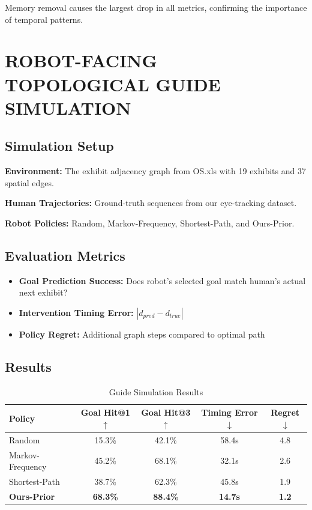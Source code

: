 \documentclass[letterpaper]{article}
\begin{document}
Memory removal causes the largest drop in all metrics, confirming the importance of temporal patterns.

\section{ROBOT-FACING TOPOLOGICAL GUIDE SIMULATION}

\subsection{Simulation Setup}

\textbf{Environment:} The exhibit adjacency graph from OS.xls with 19 exhibits and 37 spatial edges.

\textbf{Human Trajectories:} Ground-truth sequences from our eye-tracking dataset.

\textbf{Robot Policies:} Random, Markov-Frequency, Shortest-Path, and Ours-Prior.

\subsection{Evaluation Metrics}

\begin{itemize}
    \item \textbf{Goal Prediction Success:} Does robot's selected goal match human's actual next exhibit?
    \item \textbf{Intervention Timing Error:} $|d_{pred} - d_{true}|$
    \item \textbf{Policy Regret:} Additional graph steps compared to optimal path
\end{itemize}

\subsection{Results}

\begin{table}[h]
\centering
\caption{Guide Simulation Results}
\begin{tabular}{lcccc}
\toprule
Policy & Goal Hit@1$\uparrow$ & Goal Hit@3$\uparrow$ & Timing Error$\downarrow$ & Regret$\downarrow$ \\
\midrule
Random & 15.3\% & 42.1\% & 58.4s & 4.8 \\
Markov-Frequency & 45.2\% & 68.1\% & 32.1s & 2.6 \\
Shortest-Path & 38.7\% & 62.3\% & 45.8s & 1.9 \\
\textbf{Ours-Prior} & \textbf{68.3\%} & \textbf{88.4\%} & \textbf{14.7s} & \textbf{1.2} \\
\bottomrule
\end{tabular}
\label{tab:simulation}
\end{table}
\end{document}
